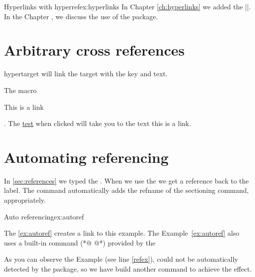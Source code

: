 \begin{texexample}{Hyperlinks with hyperref}{ex:hyperlinks}
In Chapter \ref{ch:hyperlinks} we added the |\label{ch:hyperlinks}|. In the Chapter , we discuss
the use of the  package.
\end{texexample}




\section{Arbitrary cross references}

\begin{docCommand}{hypertarget}{}
 will link the target with the key and text.
\end{docCommand}

The macro \CMDI{\hyperlink}


\hypertarget{linktest}{This is a link}.   The \hyperlink{linktest}{test} when clicked will take you to the text this is a
link.

\def\sectionautorefname{Section}
\def\exampleautorefname{Example}
\def\refexample#1{Example~\ref{#1}\xspace}
\let\exampleref\refexample
\section{Automating referencing}



\label{sec:references}

In \autoref{sec:references} we typed the \cmd{\label}. When we use the \CMDI{\autoref} we get a  reference back to the label. 
The command automatically adds the refname of the sectioning command, appropriately.


\begin{texexample}{Auto referencing}{ex:autoref}
\begin{teX}
The \autoref{ex:autoref} creates a link to this example. 
The \refexample{ex:autoref} also uses a built-in command (*@ \label{refex} @*)
provided by the 
\end{teX}
\end{texexample}

As you can observe the Example (see line \ref{refex}), could not be automatically detected by the  package, so we have build another command  to achieve the effect.

